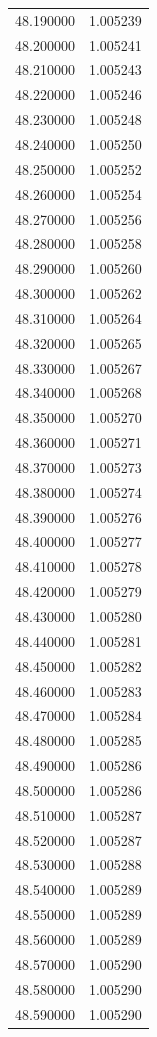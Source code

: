 \begin{tabular}{rr}
48.190000 & 1.005239 \\
48.200000 & 1.005241 \\
48.210000 & 1.005243 \\
48.220000 & 1.005246 \\
48.230000 & 1.005248 \\
48.240000 & 1.005250 \\
48.250000 & 1.005252 \\
48.260000 & 1.005254 \\
48.270000 & 1.005256 \\
48.280000 & 1.005258 \\
48.290000 & 1.005260 \\
48.300000 & 1.005262 \\
48.310000 & 1.005264 \\
48.320000 & 1.005265 \\
48.330000 & 1.005267 \\
48.340000 & 1.005268 \\
48.350000 & 1.005270 \\
48.360000 & 1.005271 \\
48.370000 & 1.005273 \\
48.380000 & 1.005274 \\
48.390000 & 1.005276 \\
48.400000 & 1.005277 \\
48.410000 & 1.005278 \\
48.420000 & 1.005279 \\
48.430000 & 1.005280 \\
48.440000 & 1.005281 \\
48.450000 & 1.005282 \\
48.460000 & 1.005283 \\
48.470000 & 1.005284 \\
48.480000 & 1.005285 \\
48.490000 & 1.005286 \\
48.500000 & 1.005286 \\
48.510000 & 1.005287 \\
48.520000 & 1.005287 \\
48.530000 & 1.005288 \\
48.540000 & 1.005289 \\
48.550000 & 1.005289 \\
48.560000 & 1.005289 \\
48.570000 & 1.005290 \\
48.580000 & 1.005290 \\
48.590000 & 1.005290 \\

\end{tabular}
